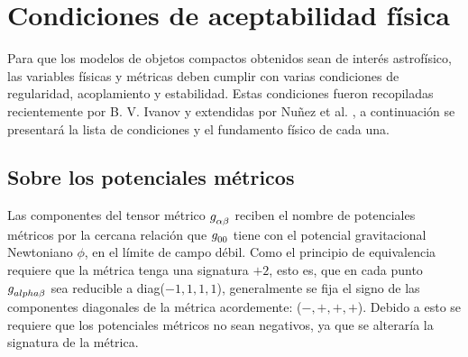 




\section{Condiciones de aceptabilidad física}\label{phyacep}
\noindent Para que los modelos de objetos compactos obtenidos sean de interés astrofísico, las variables físicas y métricas deben cumplir con varias condiciones de regularidad, acoplamiento y estabilidad. Estas condiciones fueron recopiladas recientemente por B. V. Ivanov \cite{Ivanov2017} y extendidas por Nuñez et al. \cite{Hernandez2018}, a continuación se presentará la lista de condiciones y el fundamento físico de cada una.

\subsection*{Sobre los potenciales métricos}
\noindent Las componentes del tensor métrico $\tensor{g}{_\alpha_\beta}$ reciben el nombre de potenciales métricos por la cercana relación que $\tensor{g}{_0_0}$ tiene con el potencial gravitacional Newtoniano $\phi$, en el límite de campo débil. Como el principio de equivalencia requiere que la métrica tenga una signatura $+2$, esto es, que en cada punto $\tensor{g}{_{alpha}_{\beta}}$ sea reducible a diag($-1,1,1,1$), generalmente se fija el signo de las componentes diagonales de la métrica acordemente: ($-, +, +, +$). Debido a esto se requiere que los potenciales métricos no sean negativos, ya que se alteraría la signatura de la métrica.


